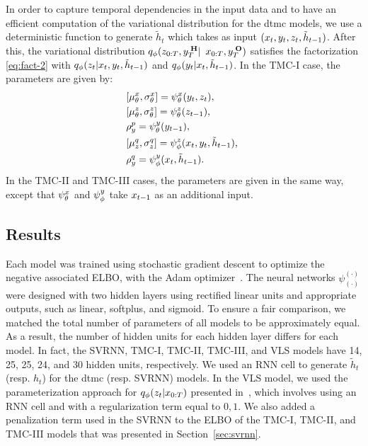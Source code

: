 In order to capture temporal dependencies 
in the input data and to have an efficient computation of the 
variational distribution for the \gls*{dtmc} models, 
we use a deterministic function to generate $\tilde{h}_t$ which  
takes as input $(x_t, y_t, z_t, \tilde{h}_{t-1})$. 
After this, the variational distribution $q_\phi(z_{0:T}, y_{T}^{\;\mathbf{H}}|$ $ x_{0:T}, y_{T}^{\;\mathbf{O}})$ satisfies the factorization \eqref{eq:fact-2}
with $q_\phi(z_t|x_t, y_t,\tilde{h}_{t-1} )$ and $q_\phi(y_t|x_t, \tilde{h}_{t-1})$. 
In the TMC-I case, the parameters are given by:
\begin{align*}
    &[ \mu_{\theta}^{x} , \sigma_{\theta}^{x} ]  = \psi^{x}_{\theta}(y_t, z_t),\\
    &[ \mu_{\theta}^{z} , \sigma_{\theta}^{z}]  = \psi^{z}_{\theta}(z_{t-1}), \\
    &\rho_{y}^{p}  = \psi^{y}_{\theta}(y_{t-1}),\\
     &[\mu_{z}^{q} , \sigma_{z}^{q}] = \psi^{z}_{\phi}( x_t, y_t,\tilde{h}_{t-1})\text{, }\\
    &\rho_{y}^{q}  = \psi^{y}_{\phi}( x_t, \tilde{h}_{t-1}) \text{.}
\end{align*} 
In the TMC-II and TMC-III cases, the parameters are given  in the same way,
except that $\psi^{x}_{\theta}$ and $\psi^{y}_{\phi}$ take $x_{t-1}$ as an additional input.



\subsection{Results}
\label{subsec:results}
Each model was trained using stochastic gradient descent to 
optimize the negative associated ELBO, with the Adam optimizer~\cite{kingma2014adam}. 
The neural networks $\psi_{(\cdot)}^{(\cdot)}$ were designed with two hidden 
layers using rectified linear units and appropriate outputs, such as linear, softplus, 
and sigmoid. To ensure a fair comparison, we matched the total number 
of parameters of all models to be approximately equal. 
As a result, the number of hidden units for each hidden layer differs 
for each model. In fact, the SVRNN, TMC-I, TMC-II, TMC-III, 
and VLS models have 14, 25, 25, 24, and 30 hidden units, respectively.
We used an RNN cell to generate $\tilde{h}_t$ (resp. $h_t$) 
for the \gls*{dtmc} (resp. SVRNN) models. 
In the VLS model, we used the parameterization approach for 
$q_\phi(z_t|x_{0:T})$ presented in~\cite{chen2019variational}, 
which involves using an RNN cell and with a regularization term equal to $0,1$.
We also added a penalization term used in the SVRNN to the ELBO of the 
TMC-I, TMC-II, and TMC-III models that was presented in Section~\ref{sec:svrnn}.



